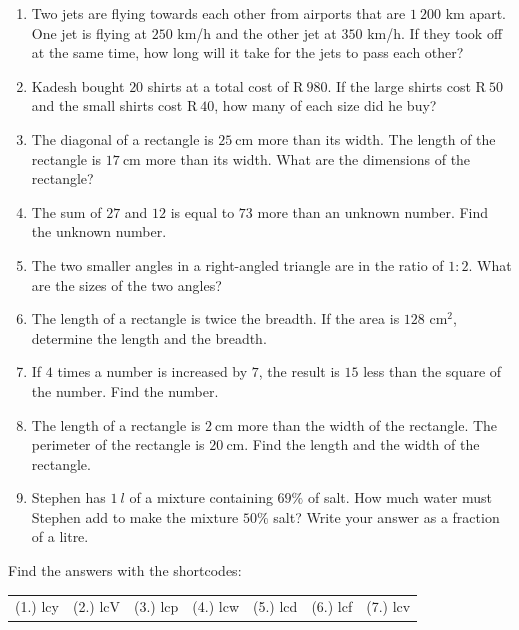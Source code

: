 \begin{exercises}{}
{
\begin{enumerate}[noitemsep, label=\textbf{\arabic*}. ] 
\item Two jets are flying towards each other from airports that are $1~200$ km apart. One jet is flying at $250$ km/h and the other jet at $350$ km/h. If they took off at the same time, how long will it take for the jets to pass each other?
\item Kadesh bought $20$ shirts at a total cost of R$~980$. If the large shirts cost R$~50$ and the small shirts cost R$~40$, how many of each size did he buy?
\item The diagonal of a rectangle is $25~$cm more than its width. The length of the rectangle is $17~$cm more than its width. What are the dimensions of the rectangle?  
\item The sum of $27$ and $12$ is equal to $73$ more than an unknown number. Find the unknown number.
\item The two smaller angles in a right-angled triangle are in the ratio of $1:2$. What are the sizes of the two angles? 
\item The length of a rectangle is twice the breadth. If the area is $128$ cm$^{2}$, determine the length and the breadth.       
\item If $4$ times a number is increased by $7$, the result is $15$ less than the square of the number. Find the number.
\item The length of a rectangle is $2~$cm more than the width of the rectangle. The perimeter of the rectangle is $20~$cm. Find the length and the width of the rectangle.
\item Stephen has $1~l$ of a mixture containing $69\%$ of salt. How much water must Stephen add to make the mixture $50\%$ salt? Write your answer as a fraction of a litre.
       
\end{enumerate}
\practiceinfo
\par {} Find the answers with the shortcodes:
\par \begin{tabular}[h]{cccccc}
(1.) lcy  &  (2.) lcV  &  (3.) lcp  &  (4.) lcw  &  (5.) lcd  &  (6.) lcf  &  (7.) lcv  & \end{tabular}
}
\end{exercises}

